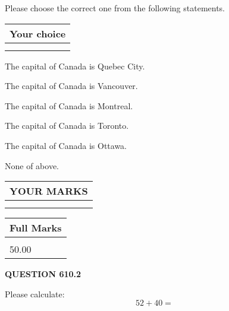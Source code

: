 \documentclass[12pt]{article}
\begin{document}
  
Please choose the correct one from the following statements.
  
  
\noindent\hspace{3.0in} \begin{tabular}{|l|}
\hline
Your choice \\
\hline
 \\ 
 \\ 
\hline
\end{tabular}
  
  
 
 
The capital of Canada is Quebec City.
 
 
The capital of Canada is Vancouver.
 
 
The capital of Canada is Montreal.
 
 
The capital of Canada is Toronto.
 
 
The capital of Canada is Ottawa.
 
 
 None of above.
 
 
  
\vspace{0.2in}
  
\noindent\begin{tabular}{|l|}
\hline
 YOUR MARKS  \\
\hline
 \\ 
 \\ 
\hline
\end{tabular}
\hspace{0.05in} \begin{tabular}{|l|}
\hline
 Full Marks  \\
\hline
 \\ 
50.00 \\
\hline
\end{tabular}
{\textbf{\Large{QUESTION
610.2 
}}}
  
  
 
Please calculate:
\begin{equation}
52 +  %
40 = \nonumber
\end{equation}
 

 

 
   
   
 \vspace{0.2in}
 
   
   
   
   
\end{document}
